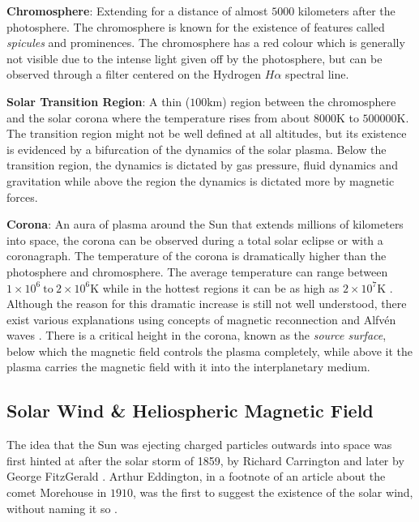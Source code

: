 \textbf{Chromosphere}: Extending for a distance of almost $5000$ kilometers after the photosphere. The chromosphere is 
known for the existence of features called \emph{spicules} and prominences. The chromosphere has a red colour which 
is generally not visible due to the intense light given off by the photosphere, but can be observed through 
a filter centered on the Hydrogen $H\alpha$ spectral line. %

\textbf{Solar Transition Region}: A thin ($100 \text{km}$) region between the chromosphere and the solar corona 
where the temperature rises from about $8000 \text{K}$ to $500000 \text{K}$. The transition region might not be well 
defined at all altitudes, but its existence is evidenced by a bifurcation of the dynamics of the solar plasma. 
Below the transition region, the dynamics is dictated by gas pressure, fluid dynamics and gravitation while 
above the region the dynamics is dictated more by magnetic forces.

\textbf{Corona}: An aura of plasma around the Sun that extends millions of kilometers into space, the corona can be 
observed during a total solar eclipse or with a coronagraph. The temperature of the corona is dramatically higher 
than the photosphere and chromosphere. The average temperature can range between 
$1 \times 10^6 \ \text{to} \ 2 \times 10^6 \text{K}$ while in the hottest regions it can be as high as 
$2 \times 10^7 \text{K}$ \citep{SolarCorona}. Although the reason for this dramatic increase is still 
not well understood, there exist various explanations using concepts of magnetic reconnection 
\citep{russell2001solar,SolarCorona} and Alfv\'en waves \citep{AlfvenCorona}. There is a critical height 
in the corona, known as the \emph{source surface}, below which the magnetic field controls the plasma completely, 
while above it the plasma carries the magnetic field with it into the interplanetary medium.


\subsection{Solar Wind \& Heliospheric Magnetic Field}\label{sec:hmfsolarwind}

The idea that the Sun was ejecting charged particles outwards into space was first hinted at after the solar 
storm of 1859, by Richard Carrington \citep{cliver20131859} and later by George FitzGerald \citep{meyer2007basics}. 
Arthur Eddington, in a footnote of an article about the comet Morehouse in $1910$, was the first to suggest the 
existence of the solar wind, without naming it so \citep{eddingtonFootnote}.

